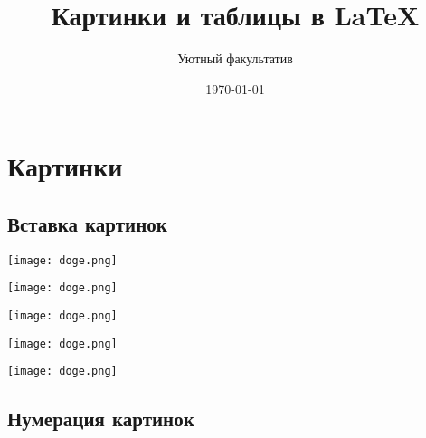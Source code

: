 \documentclass[12pt, a4paper]{article}
\author{Уютный факультатив}
\title{Картинки и таблицы в \LaTeX}
\date{\today}
\begin{document}
 

\maketitle

\section{Картинки}
\subsection{Вставка картинок}

\texttt{[image: doge.png]}


\texttt{[image: doge.png]} 

\texttt{[image: doge.png]}

\texttt{[image: doge.png]}

\texttt{[image: doge.png]}

% 
% 
%



\subsection{Нумерация картинок}

\end{document}
